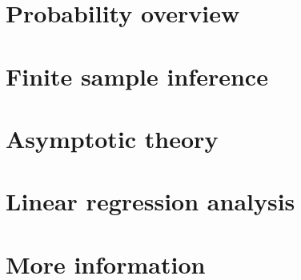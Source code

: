 \documentclass[12pt,notitlepage]{report}
\begin{document}
\part{Probability overview}


\begin{appendices}

\end{appendices}

\part{Finite sample inference}










\begin{appendices}

\end{appendices}
\newcommand*\FancyVerbStartString{## block}

\part{Asymptotic theory}





\begin{appendices}

\end{appendices}

\part{Linear regression analysis}





\begin{appendices}

\end{appendices}

\part{More information}
\begin{appendices}


\end{appendices}

{
\raggedright

}
\end{document}
